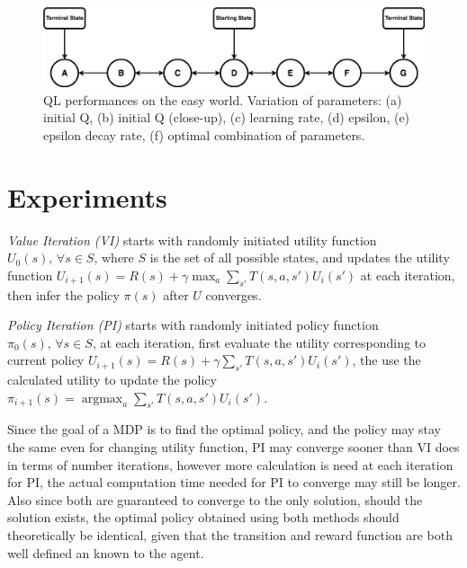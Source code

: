 \documentclass[10pt]{article}
\DeclareMathOperator*{\argmax}{argmax} %
\begin{document}
\begin{figure}[h!]
  \centering
  \includegraphics[width=\linewidth]{../problem/randomwalk.png}
    \caption{QL performances on the easy world. Variation of parameters: (a) initial Q, (b) initial Q (close-up), (c) learning rate, (d) epsilon, (e) epsilon decay rate, (f) optimal combination of parameters.}
  \label{fig:fig2}
\end{figure}


\section{Experiments} \label{experiments}
\textit{Value Iteration (VI)} starts with randomly initiated utility function $U_{0}(s) \text{,  } \forall s \in S$, where $S$ is the set of all possible states, and updates the utility function $U_{i+1}(s)=R(s)+\gamma \max_{a}\sum_{s'}T(s,a,s')U_{i}(s')$ at each iteration, then infer the policy $\pi(s)$ after $U$ converges.\par
\bigbreak
\noindent
\textit{Policy Iteration (PI)} starts with randomly initiated policy function $\pi_{0}(s) \text{,  }\forall s \in S$, at each iteration, first evaluate the utility corresponding to current policy $U_{i+1}(s)=R(s)+\gamma \sum_{s'}T(s,a,s')U_{i}(s')$, the use the calculated utility to update the policy $\pi_{i+1}(s)=\argmax_{a}\sum_{s'}T(s,a,s')U_{i}(s')$.\par
\bigbreak

Since the goal of a MDP is to find the optimal policy, and the policy may stay the same even for changing utility function, PI may converge sooner than VI does in terms of number iterations, however more calculation is need at each iteration for PI, the actual computation time needed for PI to converge may still be longer. Also since both are guaranteed to converge to the only solution, should the solution exists, the optimal policy obtained using both methods should theoretically be identical, given that the transition and reward function are both well defined an known to the agent.\par

\end{document}
